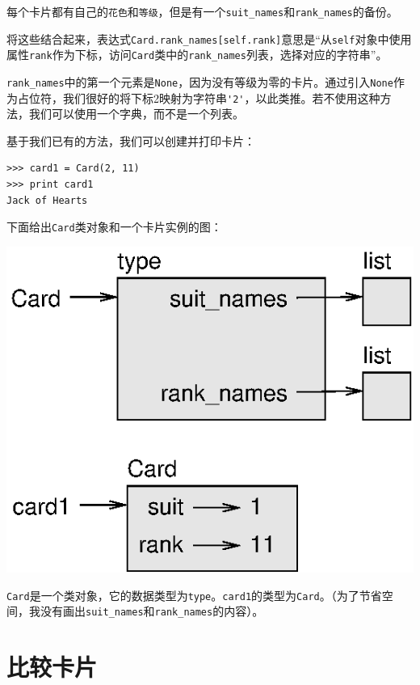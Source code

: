每个卡片都有自己的{\tt 花色}和{\tt 等级}，但是有一个\verb"suit_names"和\verb"rank_names"的备份。

将这些结合起来，表达式\verb"Card.rank_names[self.rank]"意思是“从{\tt self}对象中使用属性{\tt rank}作为下标，访问{\tt Card}类中的\verb"rank_names"列表，选择对应的字符串”。

\verb"rank_names"中的第一个元素是{\tt None}，因为没有等级为零的卡片。通过引入{\tt None}作为占位符，我们很好的将下标2映射为字符串\verb"'2'"，以此类推。若不使用这种方法，我们可以使用一个字典，而不是一个列表。

基于我们已有的方法，我们可以创建并打印卡片：

\beforeverb
\begin{verbatim}
>>> card1 = Card(2, 11)
>>> print card1
Jack of Hearts
\end{verbatim}
\afterverb
%
下面给出{\tt Card}类对象和一个卡片实例的图：


\beforefig
\centerline{\includegraphics{figs/card1.eps}}
\afterfig

{\tt Card}是一个类对象，它的数据类型为{\tt type}。{\tt card1}的类型为{\tt Card}。（为了节省空间，我没有画出\verb"suit_names"和\verb"rank_names"的内容）。


\section{比较卡片}
\label{比较卡片}


